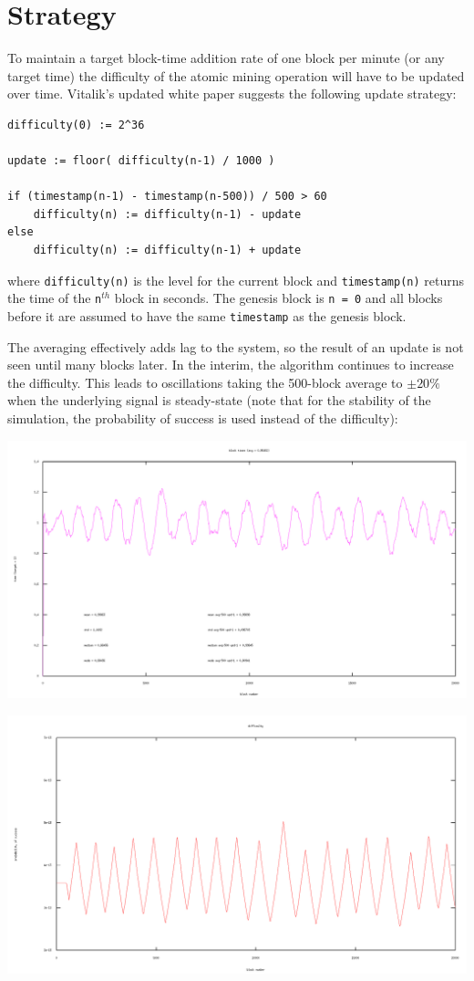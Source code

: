 \documentclass[10pt,a4paper]{article}
\begin{document}
\section*{Strategy}

To maintain a target block-time addition rate of one block per minute (or any target time) the difficulty of the atomic mining operation will have to be updated over time. Vitalik's updated white paper suggests the following update strategy:

\begin{verbatim}
difficulty(0) := 2^36 

update := floor( difficulty(n-1) / 1000 )

if (timestamp(n-1) - timestamp(n-500)) / 500 > 60
    difficulty(n) := difficulty(n-1) - update
else
    difficulty(n) := difficulty(n-1) + update
\end{verbatim}
where {\tt difficulty(n)} is the level for the current block and {\tt timestamp(n)} returns the time of the {\tt n}$^{th}$ block in seconds. The genesis block is {\tt n = 0} and all blocks before it are assumed to have the same {\tt timestamp} as the genesis block.

The averaging effectively adds lag to the system, so the result of an update is not seen until many blocks later. In the interim, the algorithm continues to increase the difficulty. This leads to oscillations taking the 500-block average to $\pm 20\%$ when the underlying signal is steady-state (note that for the stability of the simulation, the probability of success is used instead of the difficulty):

\includegraphics[width=14cm]{SimulationGraphs/simulation_avg-500_upd-1_.png}

\includegraphics[width=14cm]{SimulationGraphs/simulation_avg-500_upd-1_diff.png}
\end{document}
